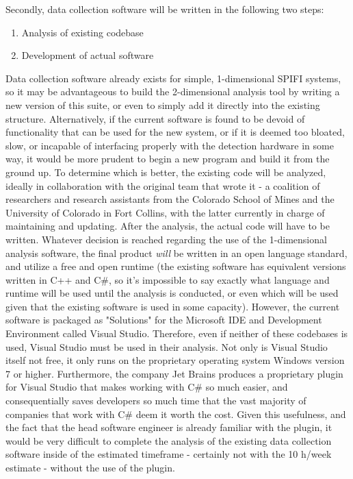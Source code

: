\documentclass[12pt]{article}
\begin{document}
Secondly, data collection software will be written in the following two
steps:
\begin{enumerate}
\item Analysis of existing codebase
\item Development of actual software
\end{enumerate}
Data collection software already exists for simple, 1-dimensional SPIFI
systems, so it may be advantageous to build the 2-dimensional analysis tool
by writing a new version of this suite, or even to simply add it directly
into the existing structure. Alternatively, if the current software is
found to be devoid of functionality that can be used for the new system, or
if it is deemed too bloated, slow, or incapable of interfacing properly
with the detection hardware in some way, it would be more prudent to begin
a new program and build it from the ground up. To determine which is
better, the existing code will be analyzed, ideally in
collaboration with the original team that wrote it - a coalition of
researchers and research assistants from the Colorado School of Mines and
the University of Colorado in Fort Collins, with the latter currently in
charge of maintaining and updating. After the analysis, the actual code
will have to be written. Whatever decision is reached regarding the use of
the 1-dimensional analysis software, the final product \emph{will} be
written in an open language standard, and utilize a free and open
runtime (the existing software has equivalent versions written in
C++ and C\#, so it's impossible to say exactly what language and runtime
will be used until the analysis is conducted, or even which will be used
given that the existing software is used in some capacity). However, the
current software is packaged as "Solutions" for the Microsoft IDE and
Development Environment called Visual Studio. Therefore, even if neither of
these codebases is used, Visual Studio must be used in their analysis. Not
only is Visual Studio itself not free, it only runs on the proprietary
operating system Windows version 7 or higher. Furthermore, the company Jet
Brains produces a proprietary plugin for Visual Studio that makes working
with C\# so much easier, and consequentially saves developers so much time
that the vast majority of companies that work with C\# deem it worth the
cost. Given this usefulness, and the fact that the head software engineer is already
familiar with the plugin, it would be very difficult to complete the
analysis of the existing data collection software inside of the estimated
timeframe - certainly not with the 10 h/week estimate - without the use
of the plugin.
\end{document}
